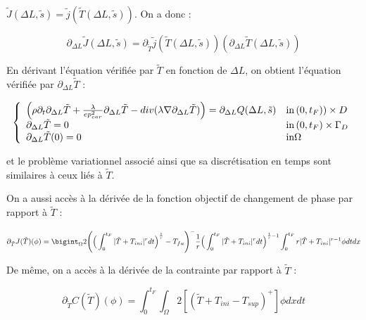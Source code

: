 \documentclass[11pt,a4paper]{article}
\begin{document}
$\tilde{J}(\Delta L,\tilde{s})=\tilde{j}(\tilde{T}(\Delta L,\tilde{s}))$. On a donc :

\begin{equation}
\partial_{\Delta L}\tilde{J}(\Delta L,\tilde{s})=\partial_{\tilde{T}}\tilde{j}(\tilde{T}(\Delta L,\tilde{s}))(\partial_{\Delta L}\tilde{T}(\Delta L,\tilde{s}))
\end{equation}

En dérivant l'équation vérifiée par $\tilde{T}$ en fonction de $\Delta L$, on obtient l'équation vérifiée par $\partial_{\Delta L}\tilde{T}$ :

\begin{equation}
\label{eq:ChaleurDerTilde}
\left\{\begin{array}{ll}
	\Big(\rho\partial_t \partial_{\Delta L}\tilde{T}+\frac{\lambda}{ep_{car}^2} \partial_{\Delta L}\tilde{T}-div(\lambda\nabla \partial_{\Delta L}\tilde{T})\Big)=\partial_{\Delta L}Q(\Delta L,\tilde{s})& \textrm{in\,}(0,t_F))\times D \\
	\partial_{\Delta L}\tilde{T}=0 & \textrm{in\,}(0,t_F)\times \Gamma_D \\
	\partial_{\Delta L}\tilde{T}(0)=0 & \textrm{in} \Omega
\end{array}\right.
\end{equation}

et le problème variationnel associé ainsi que sa discrétisation en temps sont similaires à ceux liés à $\tilde{T}$.

On a aussi accès à la dérivée de la fonction objectif de changement de phase par rapport à $\tilde{T}$ :

\begin{equation}
\partial_{\tilde{T}}J(\tilde{T})(\phi)= \bigint_{\Omega}2\Bigg(\Big(\int_{0}^{t_F}|\tilde{T}+T_{ini}|^rdt\Big)^{\frac{1}{r}}-T_{fu}\Bigg)^-\frac{1}{r}\Big(\int_{0}^{t_F}|\tilde{T}+T_{ini}|^rdt\Big)^{\frac{1}{r}-1}\int_{0}^{t_F}r|\tilde{T}+T_{ini}|^{r-1}\phi dtdx 
\end{equation}

De même, on a accès à la dérivée de la contrainte par rapport à $\tilde{T}$ :

\begin{equation}
\partial_{\tilde{T}}C(\tilde{T})(\phi)= \int_{0}^{t_F}\int_{\Omega}2[(\tilde{T}+T_{ini}-T_{sup})^+]\phi dxdt
\end{equation}
\end{document}
